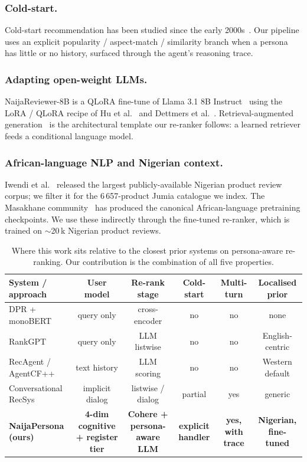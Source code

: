 \documentclass[sigconf,nonacm,balance]{acmart}
\begin{document}
\subsubsection*{Cold-start.} Cold-start recommendation has been studied
since the early 2000s~\cite{coldstart}. Our pipeline uses an explicit
popularity / aspect-match / similarity branch when a persona has little or
no history, surfaced through the agent's reasoning trace.

\subsubsection*{Adapting open-weight LLMs.} NaijaReviewer-8B is a QLoRA
fine-tune of Llama 3.1 8B Instruct~\cite{llama3} using the LoRA / QLoRA
recipe of Hu et al.~\cite{lora} and Dettmers et al.~\cite{qlora}.
Retrieval-augmented
generation~\cite{rag2020} is the architectural template our re-ranker
follows: a learned retriever feeds a conditional language model.

\subsubsection*{African-language NLP and Nigerian context.}
Iwendi et al.~\cite{iwendi} released the largest publicly-available
Nigerian product review corpus; we filter it for the 6\,657-product Jumia
catalogue we index. The Masakhane community~\cite{masakhane} has produced
the canonical African-language pretraining checkpoints. We use these
indirectly through the fine-tuned re-ranker, which is trained on
$\sim$20\,k Nigerian product reviews.

\begin{table}[t]
\centering
\caption{Where this work sits relative to the closest prior systems on
persona-aware re-ranking. Our contribution is the combination of all five
properties.}
\label{tab:relatedwork-b}
\small
\begin{tabular}{lccccc}
\toprule
\textbf{System / approach} & \textbf{User model} & \textbf{Re-rank stage} &
\textbf{Cold-start} & \textbf{Multi-turn} & \textbf{Localised prior} \\
\midrule
DPR + monoBERT~\cite{dpr,monobert}         & query only      & cross-encoder        & no       & no   & none \\
RankGPT~\cite{rankgpt}                     & query only      & LLM listwise         & no       & no   & English-centric \\
RecAgent / AgentCF++~\cite{recagent,agentcf} & text history  & LLM scoring          & no       & no   & Western default \\
Conversational RecSys~\cite{convrec}       & implicit dialog & listwise / dialog    & partial  & yes  & generic \\
\textbf{NaijaPersona (ours)} & \textbf{4-dim cognitive + register tier} & \textbf{Cohere + persona-aware LLM} & \textbf{explicit handler} & \textbf{yes, with trace} & \textbf{Nigerian, fine-tuned} \\
\bottomrule
\end{tabular}
\end{table}
\end{document}
